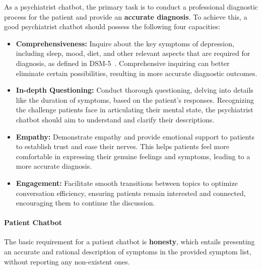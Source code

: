 As a psychiatrist chatbot, the primary task is to conduct a professional diagnostic process for the patient and provide an \textbf{accurate diagnosis}. To achieve this, a good psychiatrist chatbot should possess the following four capacities: 
\begin{itemize}
    \item \textbf{Comprehensiveness:} Inquire about the key symptoms of depression, including sleep, mood, diet, and other relevant aspects that are required for diagnosis, as defined in DSM-5~\cite{american2013diagnostic}. Comprehensive inquiring can better eliminate certain possibilities, resulting in more accurate diagnostic outcomes.
    \item \textbf{In-depth Questioning:} Conduct thorough questioning, delving into details like the duration of symptoms, based on the patient's responses. Recognizing the challenge patients face in articulating their mental state, the psychiatrist chatbot should aim to understand and clarify their descriptions.
    \item \textbf{Empathy:} Demonstrate empathy and provide emotional support to patients to establish trust and ease their nerves. This helps patients feel more comfortable in expressing their genuine feelings and symptoms, leading to a more accurate diagnosis.
    \item \textbf{Engagement:}\cite{bao-etal-2021-plato} Facilitate smooth transitions between topics to optimize conversation efficiency, ensuring patients remain interested and connected, encouraging them to continue the discussion.
\end{itemize}

\paragraph{Patient Chatbot} The basic requirement for a patient chatbot is \textbf{honesty}, which entails presenting an accurate and rational description of symptoms in the provided symptom list, without reporting any non-existent ones.

